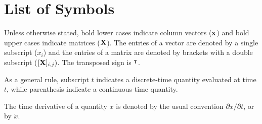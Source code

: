 \section*{List of Symbols}
Unless otherwise stated, bold lower cases indicate column vectors ($\mathbf x$) and bold upper cases indicate matrices ($\mathbf X$). The entries of a vector are denoted by a single subscript ($x_i$) and the entries of a matrix are denoted by brackets with a double subscript ($[\mathbf X]_{i,j})$. The transposed sign is $^\intercal$.

\noindent As a general rule, subscript $t$ indicates a discrete-time quantity evaluated at time $t$, while parenthesis indicate a continuous-time quantity.

\noindent The time derivative of a quantity $x$ is denoted by the usual convention $\partial x/\partial t$, or by $\dot{x}$.
